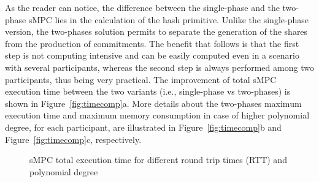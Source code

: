 As the reader can notice, the difference between the single-phase and the two-phase sMPC lies in the calculation of the hash primitive. 
Unlike the single-phase version, the two-phases solution permits to separate the generation of the shares from the production of commitments.
The benefit that follows is that the first step is not computing intensive and can be easily computed even in a scenario with several participants, whereas the second step is always performed among two participants, thus being very practical.
The improvement of total sMPC execution time between the two variants (i.e., single-phase vs two-phases) is shown in Figure~\ref{fig:timecomp}a.
More details about the two-phases maximum execution time and maximum memory consumption in case of higher polynomial degree, for each participant, are illustrated in Figure~\ref{fig:timecomp}b and Figure~\ref{fig:timecomp}c, respectively.



\begin{figure}[t]
	\centering
	\hfill
	\hfill
	\caption{sMPC total execution time for different round trip times (RTT) and polynomial degree}
	\label{fig:timertt}
\end{figure}


